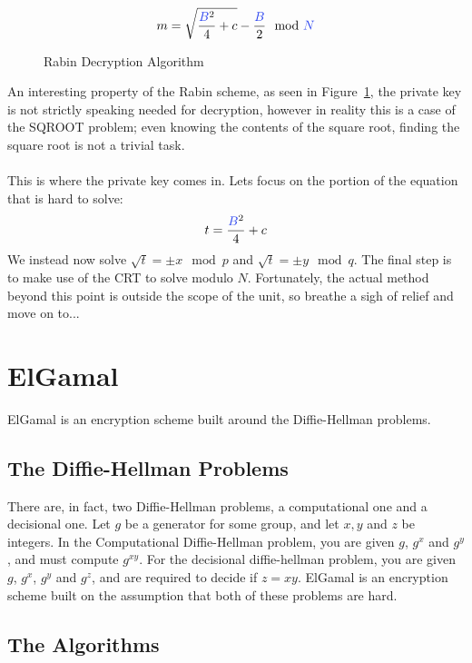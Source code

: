   \begin{figure}[htp!]
		$$m = \sqrt{\frac{\textcolor{B}{B}^2}{4}+c} - \frac{\textcolor{B}{B}}{2} \mod \textcolor{B}{N}$$
  \caption{Rabin Decryption Algorithm}
  \label{fig:rabin-dec}
  \end{figure}
	An interesting property of the Rabin scheme, as seen in Figure~\ref{fig:rabin-dec}, the private key is not strictly speaking needed for decryption, however in reality this is a case of the SQROOT problem; even knowing the contents of the square root, finding the square root is not a trivial task.\\
	\\
	This is where the private key comes in. Lets focus on the portion of the equation that is hard to solve:
	$$t = \frac{\textcolor{B}{B}^2}{4}+c$$
	We instead now solve $\sqrt{t} = \pm x\mod p $ and $\sqrt{t} = \pm y \mod q$. The final step is to make use of the CRT to solve modulo $N$. Fortunately, the actual method beyond this point is outside the scope of the unit, so breathe a sigh of relief and move on to...

\section{ElGamal}
	ElGamal is an encryption scheme built around the Diffie-Hellman problems.

	\subsection{The Diffie-Hellman Problems}

	There are, in fact, two Diffie-Hellman problems, a computational one and a decisional one. Let $g$ be a generator for some group, and let $x, y$ and $z$ be integers. In the Computational Diffie-Hellman problem, you are given $g$, $g^x$ and $g^y$, and must compute $g^{xy}$. For the decisional diffie-hellman problem, you are given $g$, $g^x$, $g^y$ and $g^z$, and are required to decide if $z=xy$. ElGamal is an encryption scheme built on the assumption that both of these problems are hard.

	\subsection{The Algorithms}

